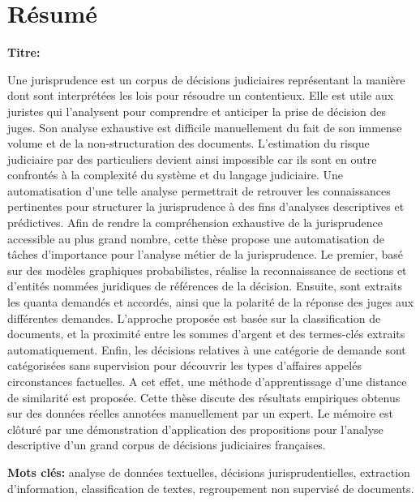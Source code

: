 \chapter*{Résumé}
\textbf{Titre:} \textsc{\titlefr}

Une jurisprudence est un corpus de décisions judiciaires représentant la manière dont sont interprétées les lois pour résoudre un contentieux. Elle est utile aux juristes qui l'analysent pour comprendre et anticiper la prise de décision des juges. Son analyse exhaustive est difficile manuellement du fait de son immense volume et de la non-structuration des documents. L'estimation du risque judiciaire par des particuliers devient ainsi impossible car ils sont en outre confrontés à la complexité du système et du langage judiciaire. Une automatisation d'une telle analyse permettrait de retrouver les connaissances pertinentes pour structurer la jurisprudence à des fins d'analyses descriptives et prédictives.  
Afin de rendre la compréhension exhaustive de la jurisprudence accessible au plus grand nombre, cette thèse propose une automatisation de tâches d'importance pour l'analyse métier de la jurisprudence. Le premier, basé sur des modèles graphiques probabilistes, réalise la reconnaissance de sections et d'entités nommées juridiques de références de la décision. Ensuite, sont extraits les quanta demandés et accordés, ainsi que la polarité de la réponse des juges aux différentes demandes. L'approche proposée est basée sur la classification de documents, et la proximité entre les sommes d'argent et des termes-clés extraits automatiquement. Enfin, les décisions relatives à une catégorie de demande sont catégorisées sans supervision pour découvrir les types d'affaires appelés circonstances factuelles. A cet effet, une méthode d'apprentissage d'une distance de similarité est proposée.
Cette thèse discute des résultats empiriques obtenus sur des données réelles annotées manuellement par un expert. Le mémoire est clôturé par une démonstration d'application des propositions pour l'analyse descriptive d'un grand corpus de décisions judiciaires françaises.


\textbf{Mots clés:} analyse de données textuelles, décisions jurisprudentielles, extraction d'information, classification de textes, regroupement non supervisé de documents.


